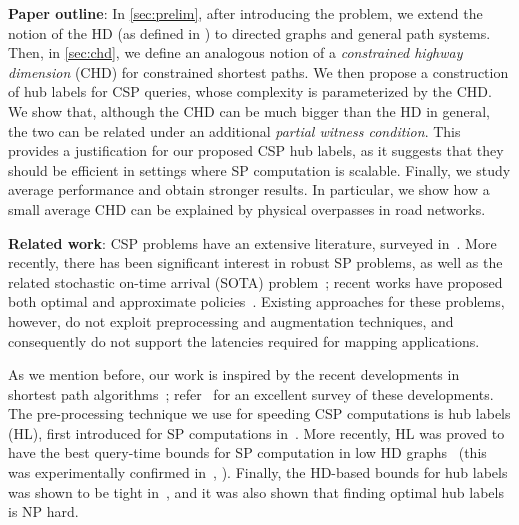 \noindent\textbf{Paper outline}:
In \cref{sec:prelim}, after introducing the problem, we extend the notion of the HD (as defined in \cite{highway2013}) to directed graphs and general path systems. Then, in \cref{sec:chd}, we define an analogous notion of a \emph{constrained highway dimension} (CHD) for constrained shortest paths. 
We then propose a construction of hub labels for CSP queries, whose complexity is parameterized by the CHD. 
We show that, although the CHD can be much bigger than the HD in general, the two can be related under an additional \emph{partial witness condition}. 
This provides a justification for our proposed CSP hub labels, as it suggests that they should be efficient in settings where SP computation is scalable.
Finally, we study average performance and obtain stronger results. 
In particular, we show how a small average CHD can be explained by physical overpasses in road networks.


\noindent\textbf{Related work}:
CSP problems have an extensive literature, surveyed in~\cite{csp_survey}. 
More recently, there has been significant interest in robust SP problems, as well as the related stochastic on-time arrival (SOTA) problem~\cite{fan2005arriving}; recent works have proposed both optimal and approximate policies~\cite{sabran2014precomputation,nikolova_discretization}. 
Existing approaches for these problems, however, do not exploit preprocessing and augmentation techniques, and consequently do not support the latencies required for mapping applications.

As we mention before, our work is inspired by the recent developments in shortest path algorithms~\cite{highway2013,hubimplem,highway2010,dimacs09,geisberger_ch_definition,skeleton}; refer~\cite{goldberg_survey} for an excellent survey of these developments. 
The pre-processing technique we use for speeding CSP computations is hub labels (HL), first introduced for SP computations in~\cite{cohen_definition_hl}. 
More recently, HL was proved to have the best query-time bounds for SP computation in low HD graphs~\cite{highway2013,highway2010} (this was experimentally confirmed in~\cite{hubimplem}, \cite[Figure 7]{goldberg_survey}).  
Finally, the HD-based bounds for hub labels was shown to be tight in~\cite{babenko_hl_complexity,white_complexity_hd}, and it was also shown that finding optimal hub labels is NP hard.

